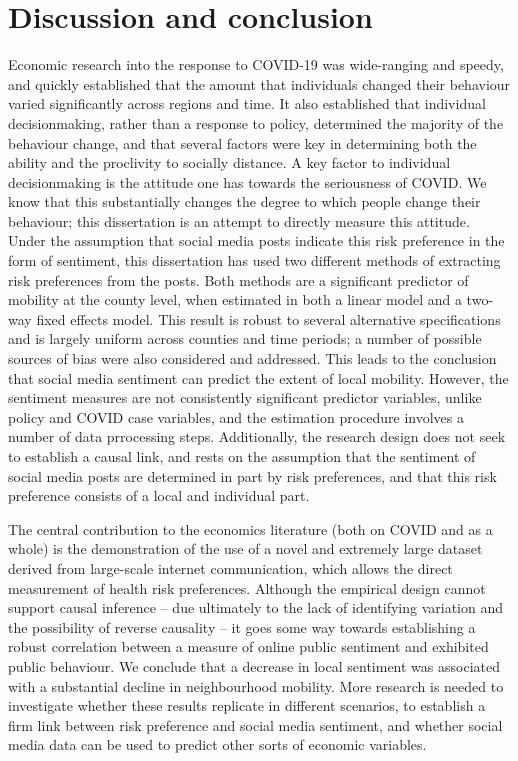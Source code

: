 \documentclass[12pt,a4]{article}
\begin{document}
\section{Discussion and conclusion} 
Economic research into the response to COVID-19 was wide-ranging and speedy, and quickly established that the amount that individuals changed their behaviour varied significantly across regions and time. It also established that individual decisionmaking, rather than a response to policy, determined the majority of the behaviour change, and that several factors were key in determining both the ability and the proclivity to socially distance. A key factor to individual decisionmaking is the attitude one has towards the seriousness of COVID. We know that this substantially changes the degree to which people change their behaviour; this dissertation is an attempt to directly measure this attitude. Under the assumption that social media posts indicate this risk preference in the form of sentiment, this dissertation has used two different methods of extracting risk preferences from the posts. Both methods are a significant predictor of mobility at the county level, when estimated in both a linear model and a two-way fixed effects model. This result is robust to several alternative specifications and is largely uniform across counties and time periods; a number of possible sources of bias were also considered and addressed. This leads to the conclusion that social media sentiment can predict the extent of local mobility. However, the sentiment measures are not consistently significant predictor variables, unlike policy and COVID case variables, and the estimation procedure involves a number of data prrocessing steps. Additionally, the research design does not seek to establish a causal link, and rests on the assumption that the sentiment of social media posts are determined in part by risk preferences, and that this risk preference consists of a local and individual part.


The central contribution to the economics literature (both on COVID and as a whole) is the demonstration of the use of a novel and extremely large dataset derived from large-scale internet communication, which allows the direct measurement of health risk preferences. Although the empirical design cannot support causal inference -- due ultimately to the lack of identifying variation and the possibility of reverse causality -- it goes some way towards establishing a robust correlation between a measure of online public sentiment and exhibited public behaviour. We conclude that a decrease in local sentiment was associated with a substantial decline in neighbourhood mobility. More research is needed to investigate whether these results replicate in different scenarios, to establish a firm link between risk preference and social media sentiment, and whether social media data can  be used to predict other sorts of economic variables. 
\end{document}
